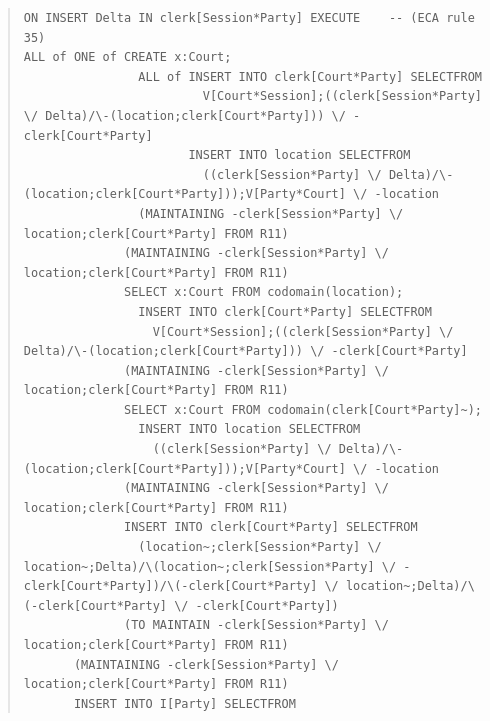 \documentclass[10pt,a4paper]{report}              %
\theoremstyle{plain}\theorembodyfont{\rmfamily}\newtheorem{definition}{Definition}[section]
\theoremstyle{plain}\theorembodyfont{\rmfamily}\newtheorem{designrule}[definition]{Requirement}
\begin{document}
\begin{quote}
\begin{verbatim}
ON INSERT Delta IN clerk[Session*Party] EXECUTE    -- (ECA rule 35)
ALL of ONE of CREATE x:Court;
                ALL of INSERT INTO clerk[Court*Party] SELECTFROM
                         V[Court*Session];((clerk[Session*Party] \/ Delta)/\-(location;clerk[Court*Party])) \/ -clerk[Court*Party]
                       INSERT INTO location SELECTFROM
                         ((clerk[Session*Party] \/ Delta)/\-(location;clerk[Court*Party]));V[Party*Court] \/ -location
                (MAINTAINING -clerk[Session*Party] \/ location;clerk[Court*Party] FROM R11)
              (MAINTAINING -clerk[Session*Party] \/ location;clerk[Court*Party] FROM R11)
              SELECT x:Court FROM codomain(location);
                INSERT INTO clerk[Court*Party] SELECTFROM
                  V[Court*Session];((clerk[Session*Party] \/ Delta)/\-(location;clerk[Court*Party])) \/ -clerk[Court*Party]
              (MAINTAINING -clerk[Session*Party] \/ location;clerk[Court*Party] FROM R11)
              SELECT x:Court FROM codomain(clerk[Court*Party]~);
                INSERT INTO location SELECTFROM
                  ((clerk[Session*Party] \/ Delta)/\-(location;clerk[Court*Party]));V[Party*Court] \/ -location
              (MAINTAINING -clerk[Session*Party] \/ location;clerk[Court*Party] FROM R11)
              INSERT INTO clerk[Court*Party] SELECTFROM
                (location~;clerk[Session*Party] \/ location~;Delta)/\(location~;clerk[Session*Party] \/ -clerk[Court*Party])/\(-clerk[Court*Party] \/ location~;Delta)/\(-clerk[Court*Party] \/ -clerk[Court*Party])
              (TO MAINTAIN -clerk[Session*Party] \/ location;clerk[Court*Party] FROM R11)
       (MAINTAINING -clerk[Session*Party] \/ location;clerk[Court*Party] FROM R11)
       INSERT INTO I[Party] SELECTFROM

\end{verbatim}
\end{quote}
\end{document}
